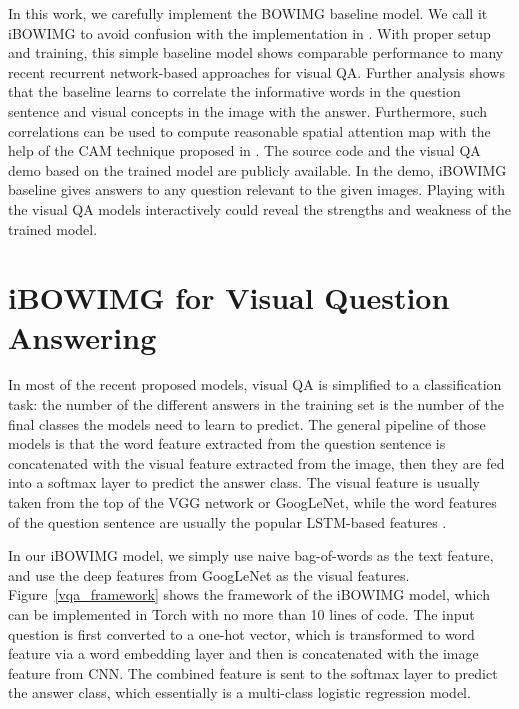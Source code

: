 \documentclass{article} %
\begin{document}
In this work, we carefully implement the BOWIMG baseline model. We call it iBOWIMG to avoid confusion with the implementation in \cite{antol2015vqa}. With proper setup and training, this simple baseline model shows comparable performance to many recent recurrent network-based approaches for visual QA. Further analysis shows that the baseline learns to correlate the informative words in the question sentence and visual concepts in the image with the answer. Furthermore, such correlations can be used to compute reasonable spatial attention map with the help of the CAM technique proposed in \cite{zhou2014learning}. The source code and the visual QA demo based on the trained model are publicly available. In the demo, iBOWIMG baseline gives answers to any question relevant to the given images. Playing with the visual QA models interactively could reveal the strengths and weakness of the trained model. 

\section{iBOWIMG for Visual Question Answering}
In most of the recent proposed models, visual QA is simplified to a classification task: the number of the different answers in the training set is the number of the final classes the models need to learn to predict. The general pipeline of those models is that the word feature extracted from the question sentence is concatenated with the visual feature extracted from the image, then they are fed into a softmax layer to predict the answer class. The visual feature is usually taken from the top of the VGG network or GoogLeNet, while the word features of the question sentence are usually the popular LSTM-based features \cite{ren2015exploring,antol2015vqa}. 

In our iBOWIMG model, we simply use naive bag-of-words as the text feature, and use the deep features from GoogLeNet \cite{szegedy2014going} as the visual features. Figure~\ref{vqa_framework} shows the framework of the iBOWIMG model, which can be implemented in Torch with no more than 10 lines of code. The input question is first converted to a one-hot vector, which is transformed to word feature via a word embedding layer and then is concatenated with the image feature from CNN. The combined feature is sent to the softmax layer to predict the answer class, which essentially is a multi-class logistic regression model.
\end{document}
